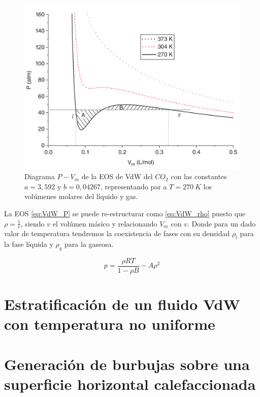 \begin{figure}[h!]
	\centering
	\includegraphics[width=.8\textwidth]{figs/cap2/Diagrama_P_V_del_CO2_Multiphase_LBM}
	\caption{Diagrama $P - V_m$ de la EOS de VdW del $CO_2$ con las constantes $a = 3,592$ y $b = 0,04267$, representando par a $T = 270 \> K$ los volúmenes molares del líquido y gas. \cite{huang2015multiphase}}
	\label{fig:P_V_CO2}	
\end{figure}


La EOS \ref{eq:VdW_P} se puede re-estructurar como \ref{eq:VdW_rho} puesto que $\rho = \frac{1}{v}$, siendo $v$ el volúmen másico y relacionando $V_m$ con $v$. Donde para un dado valor de temperatura tendremos la coexistencia de fases con su densidad $\rho_l$ para la fase líquida y $\rho_g$ para la gaseosa.

\begin{equation}
p = \frac{\rho R T}{1- \rho B} - A {\rho}^{2}
\label{eq:VdW_rho}
\end{equation}


\section{Estratificación de un fluido VdW con temperatura no uniforme}



\section{Generación de burbujas sobre una superficie horizontal calefaccionada}
